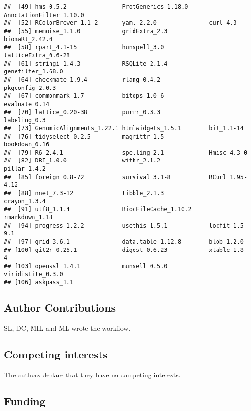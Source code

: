 \documentclass[
  9pt,
  a4paper,
]{extarticle}
\begin{document}
\begin{verbatim}
##  [49] hms_0.5.2                ProtGenerics_1.18.0      AnnotationFilter_1.10.0 
##  [52] RColorBrewer_1.1-2       yaml_2.2.0               curl_4.3                
##  [55] memoise_1.1.0            gridExtra_2.3            biomaRt_2.42.0          
##  [58] rpart_4.1-15             hunspell_3.0             latticeExtra_0.6-28     
##  [61] stringi_1.4.3            RSQLite_2.1.4            genefilter_1.68.0       
##  [64] checkmate_1.9.4          rlang_0.4.2              pkgconfig_2.0.3         
##  [67] commonmark_1.7           bitops_1.0-6             evaluate_0.14           
##  [70] lattice_0.20-38          purrr_0.3.3              labeling_0.3            
##  [73] GenomicAlignments_1.22.1 htmlwidgets_1.5.1        bit_1.1-14              
##  [76] tidyselect_0.2.5         magrittr_1.5             bookdown_0.16           
##  [79] R6_2.4.1                 spelling_2.1             Hmisc_4.3-0             
##  [82] DBI_1.0.0                withr_2.1.2              pillar_1.4.2            
##  [85] foreign_0.8-72           survival_3.1-8           RCurl_1.95-4.12         
##  [88] nnet_7.3-12              tibble_2.1.3             crayon_1.3.4            
##  [91] utf8_1.1.4               BiocFileCache_1.10.2     rmarkdown_1.18          
##  [94] progress_1.2.2           usethis_1.5.1            locfit_1.5-9.1          
##  [97] grid_3.6.1               data.table_1.12.8        blob_1.2.0              
## [100] git2r_0.26.1             digest_0.6.23            xtable_1.8-4            
## [103] openssl_1.4.1            munsell_0.5.0            viridisLite_0.3.0       
## [106] askpass_1.1
\end{verbatim}

\hypertarget{author-contributions}{%
\subsection{Author Contributions}\label{author-contributions}}

SL, DC, MIL and ML wrote the workflow.

\hypertarget{competing-interests}{%
\subsection{Competing interests}\label{competing-interests}}

The authors declare that they have no competing interests.

\hypertarget{funding}{%
\subsection{Funding}\label{funding}}
\end{document}
